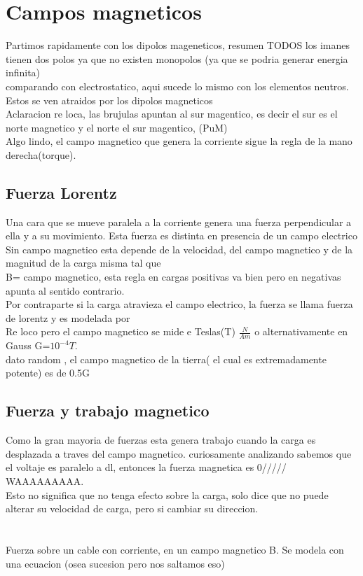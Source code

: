 \section{Campos magneticos}
 Partimos rapidamente con los dipolos mageneticos, resumen TODOS los imanes tienen dos polos ya que no existen monopolos (ya que se podria generar energia infinita)\\
comparando con electrostatico, aqui sucede lo mismo con los elementos neutros. Estos se ven atraidos por los dipolos magneticos\\
Aclaracion re loca, las brujulas apuntan al sur magentico, es decir el sur es el norte magnetico y el norte el sur magentico, (PuM)\\
Algo lindo, el campo magnetico que genera la corriente sigue la regla de la mano derecha(torque).
\subsection{Fuerza Lorentz}
Una cara que se mueve paralela a la corriente genera una fuerza perpendicular a ella y a su movimiento. Esta fuerza es distinta en presencia de un campo electrico\\
Sin campo magnetico esta depende de la velocidad, del campo magnetico y de la magnitud de la carga misma tal que
 \\ B= campo magnetico, esta regla en cargas positivas va bien pero en negativas apunta al sentido contrario.
\\ Por contraparte si la carga atravieza el campo electrico, la fuerza se llama fuerza de lorentz y es modelada por 
\\ Re loco pero el campo magnetico se mide e Teslas(T) $\frac{N}{A m}$  o alternativamente en Gauss G=$10^{-4}T$. \\
dato random , el campo magnetico de la tierra( el cual es extremadamente potente) es de 0.5G
\subsection{Fuerza y trabajo magnetico}
Como la gran mayoria de fuerzas esta genera trabajo cuando la carga es desplazada a traves del campo magnetico. 
curiosamente analizando sabemos que el voltaje es paralelo a dl, entonces la fuerza magnetica es  0///// WAAAAAAAAA.\\
Esto no significa que no tenga efecto sobre la carga, solo dice que no puede alterar su velocidad de carga, pero si cambiar su direccion.
\\ \\ \\ Fuerza sobre un cable con corriente, en un campo magnetico B. Se modela con una ecuacion (osea sucesion pero nos saltamos eso) 




